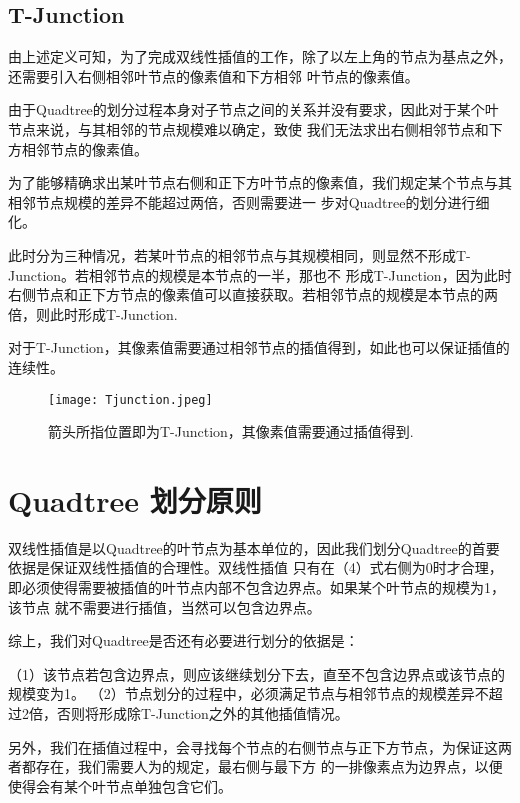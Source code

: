 \documentclass[10pt,twocolumn,letterpaper]{ctexart}
\begin{document}
\subsection{T-Junction}
   由上述定义可知，为了完成双线性插值的工作，除了以左上角的节点为基点之外，还需要引入右侧相邻叶节点的像素值和下方相邻
   叶节点的像素值。

   由于Quadtree的划分过程本身对子节点之间的关系并没有要求，因此对于某个叶节点来说，与其相邻的节点规模难以确定，致使
   我们无法求出右侧相邻节点和下方相邻节点的像素值。

   为了能够精确求出某叶节点右侧和正下方叶节点的像素值，我们规定某个节点与其相邻节点规模的差异不能超过两倍，否则需要进一
   步对Quadtree的划分进行细化。

   此时分为三种情况，若某叶节点的相邻节点与其规模相同，则显然不形成T-Junction。若相邻节点的规模是本节点的一半，那也不
   形成T-Junction，因为此时右侧节点和正下方节点的像素值可以直接获取。若相邻节点的规模是本节点的两倍，则此时形成T-Junction.

   对于T-Junction，其像素值需要通过相邻节点的插值得到，如此也可以保证插值的连续性。
   \begin{figure}[t]
   \begin{center}
      \texttt{[image: Tjunction.jpeg]}
   \end{center}
      \caption{箭头所指位置即为T-Junction，其像素值需要通过插值得到.}
   \label{fig:long}
   \label{fig:onecol}
   \end{figure}

\section{Quadtree 划分原则}
   双线性插值是以Quadtree的叶节点为基本单位的，因此我们划分Quadtree的首要依据是保证双线性插值的合理性。双线性插值
   只有在（4）式右侧为0时才合理，即必须使得需要被插值的叶节点内部不包含边界点。如果某个叶节点的规模为1，该节点
   就不需要进行插值，当然可以包含边界点。

   综上，我们对Quadtree是否还有必要进行划分的依据是：

   （1）该节点若包含边界点，则应该继续划分下去，直至不包含边界点或该节点的规模变为1。
   （2）节点划分的过程中，必须满足节点与相邻节点的规模差异不超过2倍，否则将形成除T-Junction之外的其他插值情况。

   另外，我们在插值过程中，会寻找每个节点的右侧节点与正下方节点，为保证这两者都存在，我们需要人为的规定，最右侧与最下方
   的一排像素点为边界点，以便使得会有某个叶节点单独包含它们。
\end{document}
